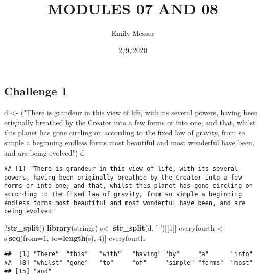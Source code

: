 \documentclass[]{article}
\title{MODULES 07 AND 08}
\author{Emily Messer}
\date{2/9/2020}
\newenvironment{Shaded}{\begin{snugshade}}{\end{snugshade}}
\newcommand{\DataTypeTok}[1]{\textcolor[rgb]{0.13,0.29,0.53}{#1}}
\newcommand{\DecValTok}[1]{\textcolor[rgb]{0.00,0.00,0.81}{#1}}
\newcommand{\KeywordTok}[1]{\textcolor[rgb]{0.13,0.29,0.53}{\textbf{#1}}}
\newcommand{\NormalTok}[1]{#1}
\newcommand{\StringTok}[1]{\textcolor[rgb]{0.31,0.60,0.02}{#1}}
\begin{document}
\maketitle

\hypertarget{challenge-1}{%
\subsection{Challenge 1}\label{challenge-1}}

\begin{Shaded}
\begin{Highlighting}[]
\NormalTok{d <-}\StringTok{ }\NormalTok{(}\StringTok{"There is grandeur in this view of life, with its several powers, having been originally breathed by the Creator into a few forms or into one; and that, whilst this planet has gone circling on according to the fixed law of gravity, from so simple a beginning endless forms most beautiful and most wonderful have been, and are being evolved"}\NormalTok{)}
\NormalTok{d}
\end{Highlighting}
\end{Shaded}

\begin{verbatim}
## [1] "There is grandeur in this view of life, with its several powers, having been originally breathed by the Creator into a few forms or into one; and that, whilst this planet has gone circling on according to the fixed law of gravity, from so simple a beginning endless forms most beautiful and most wonderful have been, and are being evolved"
\end{verbatim}

\begin{Shaded}
\begin{Highlighting}[]
\NormalTok{?}\KeywordTok{str_split}\NormalTok{()}
\KeywordTok{library}\NormalTok{(stringr)}
\NormalTok{s<-}\StringTok{ }\KeywordTok{str_split}\NormalTok{(d, }\StringTok{' '}\NormalTok{)[[}\DecValTok{1}\NormalTok{]]}
\NormalTok{everyfourth <-}\StringTok{ }\NormalTok{s[}\KeywordTok{seq}\NormalTok{(}\DataTypeTok{from=}\DecValTok{1}\NormalTok{, }\DataTypeTok{to=}\KeywordTok{length}\NormalTok{(s), }\DecValTok{4}\NormalTok{)]}
\NormalTok{everyfourth}
\end{Highlighting}
\end{Shaded}

\begin{verbatim}
##  [1] "There"  "this"   "with"   "having" "by"     "a"      "into"  
##  [8] "whilst" "gone"   "to"     "of"     "simple" "forms"  "most"  
## [15] "and"
\end{verbatim}
\end{document}
